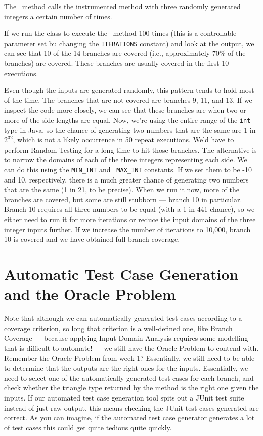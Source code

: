The \randomlytestclassifymethod~method calls the instrumented method with three
randomly generated integers a certain number of times.

If we run the class to execute the \classifymethod~method 100 times (this is a
controllable parameter set bu changing the {\tt ITERATIONS} constant) and look
at the output, we can see that 10 of the 14 branches are covered (i.e.,
approximately 70\% of the branches) are covered. These branches are usually
covered in the first 10 executions. 

Even though the inputs are generated randomly, this pattern tends to hold most
of the time. The branches that are not covered are branches 9, 11, and 13. If we
inspect the code more closely, we can see that these branches are when two or
more of the side lengths are equal. Now, we're using the entire range of the
{\tt int} type in Java, so the chance of generating two numbers that are the
same are 1 in $2^{32}$, which is not a likely occurrence in 50 repeat
executions. We'd have to perform Random Testing for a long time to hit those
branches. The alternative is to narrow the domains of each of the three integers
representing each side. We can do this using the {\tt MIN\_INT} and {\tt
MAX\_INT} constants. If we set them to be -10 and 10, respectively, there is a
much greater chance of generating two numbers that are the same (1 in 21, to be
precise). When we run it now, more of the branches are covered, but some are
still stubborn --- branch 10 in particular. Branch 10 requires all three numbers
to be equal (with a 1 in 441 chance), so we either need to run it for more
iterations or reduce the input domains of the three integer inputs further. If
we increase the number of iterations to 10,000, branch 10 is covered and we have
obtained full branch coverage. 


\section{Automatic Test Case Generation and the Oracle Problem}

Note that although we can automatically generated test cases according to a
coverage criterion, so long that criterion is a well-defined one, like Branch
Coverage --- because applying Input Domain Analysis requires some modelling that is
difficult to automate! --- we still have the Oracle Problem to contend with.
Remember the Oracle Problem from week 1? Essentially, we still need to be able
to determine that the outputs are the right ones for the inputs. Essentially, we
need to select one of the automatically generated test cases for each branch,
and check whether the triangle type returned by the method is the right one
given the inputs. If our automated test case generation tool spits out a JUnit
test suite instead of just raw output, this means checking the JUnit test cases
generated are correct. As you can imagine, if the automated test case generator
generates a lot of test cases this could get quite tedious quite quickly.

